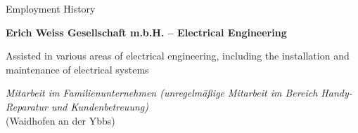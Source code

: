 \begin{rubric}{Employment History}

%
	\textbf{Erich Weiss Gesellschaft m.b.H. – Electrical Engineering}
    
     Assisted in various areas of electrical engineering, including the installation and maintenance of electrical systems


%
\textit{Mitarbeit im Familienunternehmen (unregelmäßige Mitarbeit im Bereich Handy-Reparatur und Kundenbetreuung)} \\
(Waidhofen an der Ybbs)

        
%
\end{rubric}